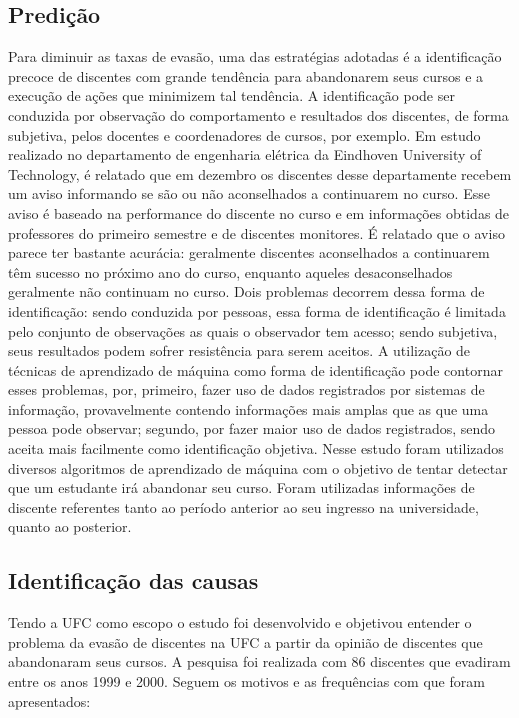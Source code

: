 \subsection{Predição}
Para diminuir as taxas de evasão, uma das estratégias adotadas é a identificação precoce de discentes com grande tendência para abandonarem seus cursos e a execução de ações que minimizem tal tendência. A identificação pode ser conduzida por observação do comportamento e resultados dos discentes, de forma subjetiva, pelos docentes e coordenadores de cursos, por exemplo. Em estudo realizado no departamento de engenharia elétrica da Eindhoven University of Technology\cite{Predicting_Students}, é relatado que em dezembro os discentes desse departamente recebem um aviso informando se são ou não aconselhados a continuarem no curso. Esse aviso é baseado na performance do discente no curso e em informações obtidas de professores do primeiro semestre e de discentes monitores. É relatado que o aviso parece ter bastante acurácia: geralmente discentes aconselhados a continuarem têm sucesso no próximo ano do curso, enquanto aqueles desaconselhados geralmente não continuam no curso.
Dois problemas decorrem dessa forma de identificação: sendo conduzida por pessoas, essa forma de identificação é limitada pelo conjunto de observações as quais o observador tem acesso; sendo subjetiva, seus resultados podem sofrer resistência para serem aceitos. A utilização de técnicas de aprendizado de máquina como forma de identificação pode contornar esses problemas, por, primeiro, fazer uso de dados registrados por sistemas de informação, provavelmente contendo informações mais amplas que as que uma pessoa pode observar; segundo, por fazer maior uso de dados registrados, sendo aceita mais facilmente como identificação objetiva. Nesse estudo foram utilizados diversos algoritmos de aprendizado de máquina com o objetivo de tentar detectar que um estudante irá abandonar seu curso. Foram utilizadas informações de discente referentes tanto ao período anterior ao seu ingresso na universidade, quanto ao posterior.

\subsection{Identificação das causas}
Tendo a UFC como escopo o estudo \cite{andriola_2003} foi desenvolvido e objetivou entender o problema da evasão de discentes na UFC a partir da opinião de discentes que abandonaram seus cursos. A pesquisa foi realizada com 86 discentes que evadiram entre os anos 1999 e 2000. Seguem os motivos e as frequências com que foram apresentados: 

